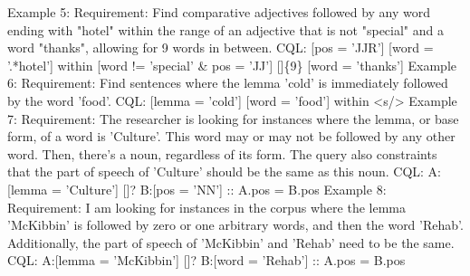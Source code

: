 \documentclass[11pt]{article}
\begin{document}
\begin{CJK*}{UTF8}{gbsn}
                                                                            Example 5:                                                                                                                                                                         Requirement: Find comparative adjectives followed by any word ending with "hotel" within the range of an adjective that is not "special" and a word "thanks", allowing for 9 words in between.                                                                                                                                                                        CQL: [pos = 'JJR'] [word = '.*hotel']  within  [word != 'special' & pos = 'JJ'] []\{9\} [word = 'thanks']                                                                                                                                                                                                                                                               Example 6:                                                                                                                                                                         Requirement: Find sentences where the lemma 'cold' is immediately followed by the word 'food'.                                                                                     CQL: [lemma = 'cold'] [word = 'food']  within <s/>                                                                                                                                                                                                                                                                                                                    Example 7:                                                                                                                                                                         Requirement: The researcher is looking for instances where the lemma, or base form, of a word is 'Culture'. This word may or may not be followed by any other word. Then, there's a noun, regardless of its form. The query also constraints that the part of speech of 'Culture' should be the same as this noun.                                                    CQL: A:[lemma = 'Culture'] []? B:[pos = 'NN']  :: A.pos = B.pos                                                                                                                                                                                                                                                                                                       Example 8:                                                                                                                                                                         Requirement: I am looking for instances in the corpus where the lemma 'McKibbin' is followed by zero or one arbitrary words, and then the word 'Rehab'. Additionally, the part of speech of 'McKibbin' and 'Rehab' need to be the same.                                                                                                                               CQL: A:[lemma = 'McKibbin'] []? B:[word = 'Rehab']  :: A.pos = B.pos 


\end{CJK*}
\end{document}
